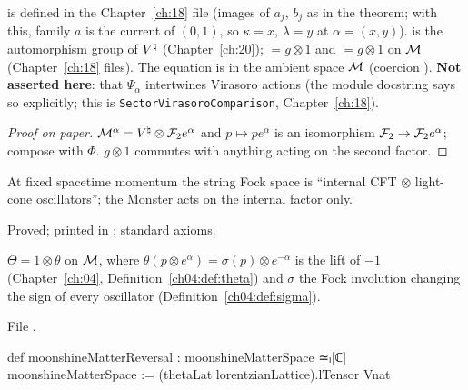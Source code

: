 \begin{dictionary}
 is defined in the Chapter~\ref{ch:18}
file  (images of $a_j$, $b_j$ as in the theorem; with this, family
$a$ is the current of $(0,1)$, so $\kappa=x$, $\lambda=y$ at $\alpha=(x,y)$).   is the automorphism group of ${V^{\natural}}$
(Chapter~\ref{ch:20});  $=g\otimes1$ and  $=g\otimes1$ on $\mathcal{M}$
(Chapter~\ref{ch:18} files).  The equation is in the ambient space $\mathcal{M}$ (coercion ).
\textbf{Not asserted here}: that $\Psi_\alpha$ intertwines Virasoro actions (the module docstring says so explicitly; this is
\texttt{SectorVirasoroComparison}, Chapter~\ref{ch:18}).
\end{dictionary}

\begin{proof}[Proof on paper]
$\mathcal{M}^\alpha={V^{\natural}}\otimes\mathcal{F}_2e^\alpha$ and $p\mapsto pe^\alpha$ is an isomorphism $\mathcal{F}_2\to\mathcal{F}_2e^\alpha$; compose with $\Phi$.
$g\otimes1$ commutes with anything acting on the second factor.
\end{proof}

\begin{physics}
At fixed spacetime momentum the string Fock space is ``internal CFT $\otimes$ light-cone oscillators''; the Monster acts on
the internal factor only.
\end{physics}

\begin{status}
Proved; printed in ; standard axioms.
\end{status}

\begin{definition}\label{ch17:def:reversal}
$\Theta=1\otimes\theta$ on $\mathcal{M}$, where $\theta(p\otimes e^\alpha)=\sigma(p)\otimes e^{-\alpha}$ is the lift of $-1$ (Chapter~\ref{ch:04},
Definition~\ref{ch04:def:theta}) and $\sigma$ the Fock involution changing the sign of every oscillator
(Definition~\ref{ch04:def:sigma}).
\end{definition}

\noindent File .
\begin{leancode}
def moonshineMatterReversal : moonshineMatterSpace ≃ₗ[ℂ] moonshineMatterSpace :=
  (thetaLat lorentzianLattice).lTensor Vnat
\end{leancode}


